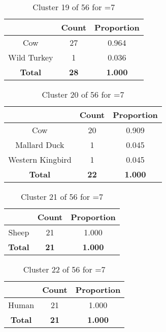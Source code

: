 \begin{table}[ht!]
\centering
\begin{tabular}{|c|c|c|}
\hline
\bf \Spec{} &\bf Count &\bf Proportion\\ \hline \hline
Cow & 27 & 0.964\\ \hline
Wild Turkey & 1 & 0.036\\ \hline
\hline
\bf Total & \bf 28 & \bf 1.000\\ \hline
\end{tabular}
\label{tab:cluster:19:7}
\caption{Cluster 19 of 56 for \minneigh{}=7}
\end{table}

\clearpage
\begin{table}[ht!]
\centering
\begin{tabular}{|c|c|c|}
\hline
\bf \Spec{} &\bf Count &\bf Proportion\\ \hline \hline
Cow & 20 & 0.909\\ \hline
Mallard Duck & 1 & 0.045\\ \hline
Western Kingbird & 1 & 0.045\\ \hline
\hline
\bf Total & \bf 22 & \bf 1.000\\ \hline
\end{tabular}
\label{tab:cluster:20:7}
\caption{Cluster 20 of 56 for \minneigh{}=7}
\end{table}

\begin{table}[ht!]
\centering
\begin{tabular}{|c|c|c|}
\hline
\bf \Spec{} &\bf Count &\bf Proportion\\ \hline \hline
Sheep & 21 & 1.000\\ \hline
\hline
\bf Total & \bf 21 & \bf 1.000\\ \hline
\end{tabular}
\label{tab:cluster:21:7}
\caption{Cluster 21 of 56 for \minneigh{}=7}
\end{table}

\begin{table}[ht!]
\centering
\begin{tabular}{|c|c|c|}
\hline
\bf \Spec{} &\bf Count &\bf Proportion\\ \hline \hline
Human & 21 & 1.000\\ \hline
\hline
\bf Total & \bf 21 & \bf 1.000\\ \hline
\end{tabular}
\label{tab:cluster:22:7}
\caption{Cluster 22 of 56 for \minneigh{}=7}
\end{table}

